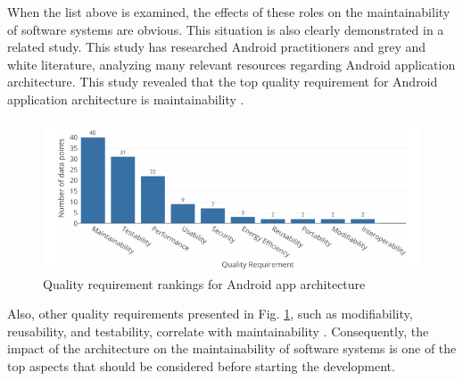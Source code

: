 When the list above is examined, the effects of these roles on the maintainability of software systems are obvious. This situation is also clearly demonstrated in a related study. This study has researched Android practitioners and grey and white literature, analyzing many relevant resources regarding Android application architecture. This study revealed that the top quality requirement for Android application architecture is maintainability \cite{14}.
\begin{figure}[ht!]
    \centering
    \includegraphics[scale=0.5]{figures/quality_req.png}
    \caption{Quality requirement rankings for Android app architecture \protect\cite{14}}
    \label{fig:arch_quality_req_ranking}
\end{figure}
\FloatBarrier

Also, other quality requirements presented in Fig. \ref{fig:arch_quality_req_ranking}, such as modifiability, reusability, and testability, correlate with maintainability  \cite{53}. Consequently, the impact of the architecture on the maintainability of software systems is one of the top aspects that should be considered before starting the development.